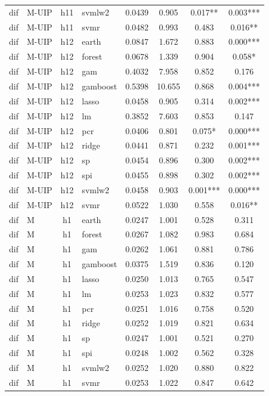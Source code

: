 \begin{ThreePartTable}
\begin{longtable}[t]{llclcccc}
dif & M-UIP & h11 & svmlw2 & 0.0439 & 0.905 & 0.017** & 0.003***\\
dif & M-UIP & h11 & svmr & 0.0482 & 0.993 & 0.483 & 0.016**\\
\addlinespace
dif & M-UIP & h12 & earth & 0.0847 & 1.672 & 0.883 & 0.000***\\
dif & M-UIP & h12 & forest & 0.0678 & 1.339 & 0.904 & 0.058*\\
dif & M-UIP & h12 & gam & 0.4032 & 7.958 & 0.852 & 0.176\\
dif & M-UIP & h12 & gamboost & 0.5398 & 10.655 & 0.868 & 0.004***\\
dif & M-UIP & h12 & lasso & 0.0458 & 0.905 & 0.314 & 0.002***\\
dif & M-UIP & h12 & lm & 0.3852 & 7.603 & 0.853 & 0.147\\
dif & M-UIP & h12 & pcr & 0.0406 & 0.801 & 0.075* & 0.000***\\
dif & M-UIP & h12 & ridge & 0.0441 & 0.871 & 0.232 & 0.001***\\
dif & M-UIP & h12 & sp & 0.0454 & 0.896 & 0.300 & 0.002***\\
dif & M-UIP & h12 & spi & 0.0455 & 0.898 & 0.302 & 0.002***\\
dif & M-UIP & h12 & svmlw2 & 0.0458 & 0.903 & 0.001*** & 0.000***\\
dif & M-UIP & h12 & svmr & 0.0522 & 1.030 & 0.558 & 0.016**\\
\addlinespace
dif & M & h1 & earth & 0.0247 & 1.001 & 0.528 & 0.311\\
dif & M & h1 & forest & 0.0267 & 1.082 & 0.983 & 0.684\\
dif & M & h1 & gam & 0.0262 & 1.061 & 0.881 & 0.786\\
dif & M & h1 & gamboost & 0.0375 & 1.519 & 0.836 & 0.120\\
dif & M & h1 & lasso & 0.0250 & 1.013 & 0.765 & 0.547\\
dif & M & h1 & lm & 0.0253 & 1.023 & 0.832 & 0.577\\
dif & M & h1 & pcr & 0.0251 & 1.016 & 0.758 & 0.520\\
dif & M & h1 & ridge & 0.0252 & 1.019 & 0.821 & 0.634\\
dif & M & h1 & sp & 0.0247 & 1.001 & 0.521 & 0.270\\
dif & M & h1 & spi & 0.0248 & 1.002 & 0.562 & 0.328\\
dif & M & h1 & svmlw2 & 0.0252 & 1.020 & 0.880 & 0.822\\
dif & M & h1 & svmr & 0.0253 & 1.022 & 0.847 & 0.642\\

\end{longtable}
\end{ThreePartTable}
